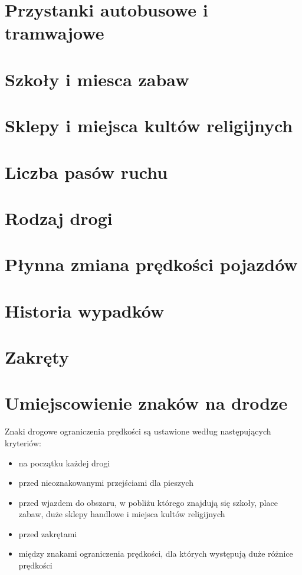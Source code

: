 \newpage
\section{Przystanki autobusowe i tramwajowe}
\label{sec:zakręty}

\newpage
\section{Szkoły i miesca zabaw}
\label{sec:zakręty}

\newpage
\section{Sklepy i miejsca kultów religijnych}
\label{sec:zakręty}

\newpage
\section{Liczba pasów ruchu}
\label{sec:zakręty}

\newpage
\section{Rodzaj drogi}
\label{sec:zakręty}

\newpage
\section{Płynna zmiana prędkości pojazdów}
\label{sec:zakręty}

\newpage
\section{Historia wypadków}
\label{sec:zakręty}

\newpage
\section{Zakręty}
\label{sec:zakręty}

\section{Umiejscowienie znaków na drodze}
\label{sec:speedLimitLocalization}
Znaki drogowe ograniczenia prędkości są ustawione według następujących kryteriów:
\begin{itemize}
\item na początku każdej drogi
\item przed nieoznakowanymi przejściami dla pieszych
\item przed wjazdem do obszaru, w pobliżu którego znajdują się szkoły, place zabaw, duże sklepy handlowe i miejsca kultów religijnych
\item przed zakrętami
\item między znakami ograniczenia prędkości, dla których występują duże różnice prędkości
\end{itemize}

